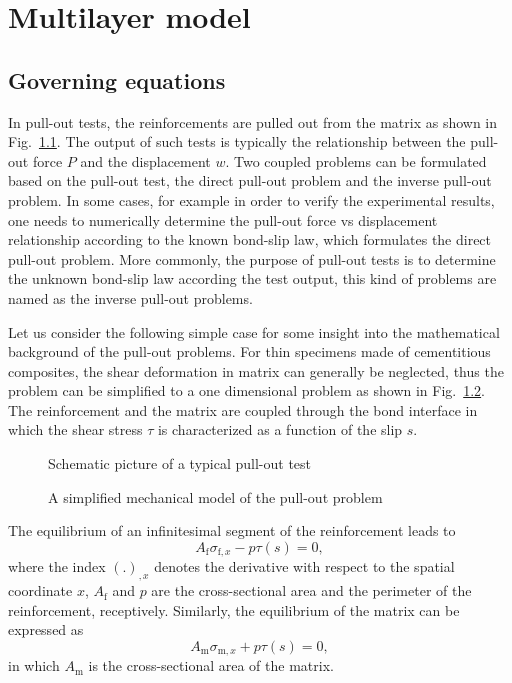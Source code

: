 \documentclass[main.tex]{subfiles}
\begin{document}
\chapter{Multilayer model}

\section{Governing equations}

In pull-out tests, the reinforcements are pulled out from the matrix as shown in Fig.~\ref{fig:pullout}. The output of such tests is typically the relationship between the pull-out force $P$ and the displacement $w$. Two coupled problems can be formulated based on the pull-out test, the direct pull-out problem and the inverse pull-out problem. In some cases, for example in order to verify the experimental results, one needs to numerically determine the pull-out force vs displacement relationship according to the known bond-slip law, which formulates the direct pull-out problem. More commonly, the purpose of pull-out tests is to determine the unknown bond-slip law according the test output, this kind of problems are named as the inverse pull-out problems.   

Let us consider the following simple case for some insight into the mathematical background of the pull-out problems. For thin specimens made of cementitious composites, the shear deformation in matrix can generally be neglected, thus the problem can be simplified to a one dimensional problem as shown in Fig.~\ref{fig:simplified}. The reinforcement and the matrix are coupled through the bond interface in which the shear stress $\tau$ is characterized as a function of the slip $s$.
\begin{figure}[tb!]
	\centering
	\caption{Schematic picture of a typical pull-out test}
	\label{fig:pullout}
\end{figure}
\begin{figure}[tb!]
	\centering
	\caption{A simplified mechanical model of the pull-out problem}
	\label{fig:simplified}
\end{figure}
The equilibrium of an infinitesimal segment of the reinforcement leads to
\begin{equation} \label{eq:f_equi}
 {A_{\mathrm{f}}}\sigma_{\mathrm{f},x} - p \tau(s) = 0,
\end{equation}
where the index $(.)_{,x}$ denotes the derivative with respect to the spatial coordinate $x$, $A_{\mathrm{f}}$  and $p$ are the cross-sectional area and the perimeter of the reinforcement, receptively. Similarly, the equilibrium of the matrix can be expressed as
\begin{equation} \label{eq:m_equi}
 {A_{\mathrm{m}}}\sigma_{\mathrm{m},x} + p \tau(s) = 0,
\end{equation}
in which $A_\mathrm{m}$ is the cross-sectional area of the matrix.
\end{document}
